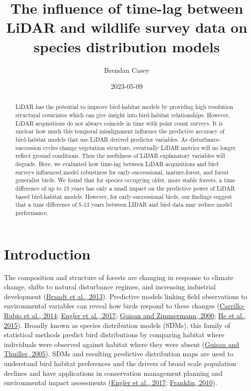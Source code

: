 \documentclass[
  12pt,
]{article}
\title{The influence of time-lag between LiDAR and wildlife survey data on species distribution models}
\author{Brendan Casey}
\date{2023-05-09}
\begin{document}
\maketitle
\begin{abstract}
LiDAR has the potential to improve bird-habitat models by providing high resolution structural covariates which can give insight into bird-habitat relationships. However, LiDAR acquisitions do not always coincide in time with point count surveys. It is unclear how much this temporal misalignment influence the predictive accuracy of bird-habitat models that use LiDAR derived predictor variables. As disturbance-succession cycles change vegetation structure, eventually LiDAR metrics will no longer reflect ground conditions. Thus the usefulness of LiDAR explanatory variables will degrade. Here, we evaluated how time-lag between LiDAR acquisitions and bird surveys influenced model robustness for early-successional, mature-forest, and forest generalist birds. We found that for species occupying older, more stable forests, a time difference of up to 15 years has only a small impact on the predictive power of LiDAR based bird-habitat models. However, for early-successional birds, our findings suggest that a time difference of 5-13 years between LIDAR and bird data may reduce model performance.
\end{abstract}

{
\hypersetup{linkcolor=}
\setcounter{tocdepth}{2}
\tableofcontents
}
\listoffigures
\listoftables
{}
\doublespacing

\hypertarget{introduction}{%
\section{Introduction}\label{introduction}}

The composition and structure of forests are changing in response to climate change, shifts to natural disturbance regimes, and increasing industrial development (\protect\hyperlink{ref-Brandt2013}{Brandt et al., 2013}). Predictive models linking field observations to environmental variables can reveal how birds respond to these changes (\protect\hyperlink{ref-Carrillo-Rubio2014}{Carrillo-Rubio et al., 2014}; \protect\hyperlink{ref-englerAvianSDMsCurrent2017}{Engler et al., 2017}; \protect\hyperlink{ref-guisanPredictiveHabitatDistribution2000}{Guisan and Zimmermann, 2000}; \protect\hyperlink{ref-He2015}{He et al., 2015}). Broadly known as species distribution models (SDMs), this family of statistical methods predict bird distributions by comparing habitat where individuals were observed against habitat where they were absent (\protect\hyperlink{ref-Guisan2005}{Guisan and Thuiller, 2005}). SDMs and resulting predictive distribution maps are used to understand bird habitat preferences and the drivers of broad scale population declines and have applications in conservation management planning and environmental impact assessments (\protect\hyperlink{ref-englerAvianSDMsCurrent2017}{Engler et al., 2017}; \protect\hyperlink{ref-franklinMappingSpeciesDistributions2010}{Franklin, 2010}).
\end{document}
